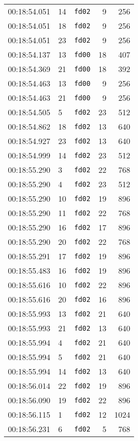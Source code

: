 \documentclass{article}
\begin{document}
\begin{longtable}{lllrr}
00:18:54.051 & 14 & \texttt{fd02} & 9 & 256 \\
00:18:54.051 & 18 & \texttt{fd02} & 9 & 256 \\
00:18:54.051 & 23 & \texttt{fd02} & 9 & 256 \\
00:18:54.137 & 13 & \texttt{fd00} & 18 & 407 \\
00:18:54.369 & 21 & \texttt{fd00} & 18 & 392 \\
00:18:54.463 & 13 & \texttt{fd00} & 9 & 256 \\
00:18:54.463 & 21 & \texttt{fd00} & 9 & 256 \\
00:18:54.505 & 5 & \texttt{fd02} & 23 & 512 \\
00:18:54.862 & 18 & \texttt{fd02} & 13 & 640 \\
00:18:54.927 & 23 & \texttt{fd02} & 13 & 640 \\
00:18:54.999 & 14 & \texttt{fd02} & 23 & 512 \\
00:18:55.290 & 3 & \texttt{fd02} & 22 & 768 \\
00:18:55.290 & 4 & \texttt{fd02} & 23 & 512 \\
00:18:55.290 & 10 & \texttt{fd02} & 19 & 896 \\
00:18:55.290 & 11 & \texttt{fd02} & 22 & 768 \\
00:18:55.290 & 16 & \texttt{fd02} & 17 & 896 \\
00:18:55.290 & 20 & \texttt{fd02} & 22 & 768 \\
00:18:55.291 & 17 & \texttt{fd02} & 19 & 896 \\
00:18:55.483 & 16 & \texttt{fd02} & 19 & 896 \\
00:18:55.616 & 10 & \texttt{fd02} & 22 & 896 \\
00:18:55.616 & 20 & \texttt{fd02} & 16 & 896 \\
00:18:55.993 & 13 & \texttt{fd02} & 21 & 640 \\
00:18:55.993 & 21 & \texttt{fd02} & 13 & 640 \\
00:18:55.994 & 4 & \texttt{fd02} & 21 & 640 \\
00:18:55.994 & 5 & \texttt{fd02} & 21 & 640 \\
00:18:55.994 & 14 & \texttt{fd02} & 13 & 640 \\
00:18:56.014 & 22 & \texttt{fd02} & 19 & 896 \\
00:18:56.090 & 19 & \texttt{fd02} & 22 & 896 \\
00:18:56.115 & 1 & \texttt{fd02} & 12 & 1024 \\
00:18:56.231 & 6 & \texttt{fd02} & 5 & 768 \\

\end{longtable}
\end{document}
